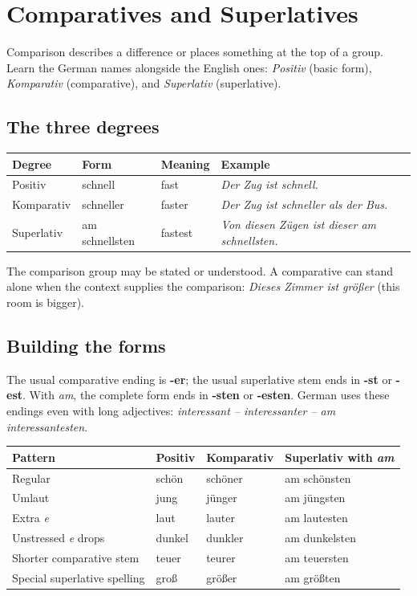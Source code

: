 \chapter{Comparatives and Superlatives}
\label{chap:comparison}

Comparison describes a difference or places something at the top of a group.
Learn the German names alongside the English ones: \textit{Positiv}
(basic form), \textit{Komparativ} (comparative), and \textit{Superlativ}
(superlative).

\section{The three degrees}

\begin{center}
\small
{}
\begin{tabularx}{\textwidth}{@{}lllX@{}}
\toprule
Degree & Form & Meaning & Example \\
\midrule
Positiv & schnell & fast & \textit{Der Zug ist schnell.} \\
Komparativ & schneller & faster & \textit{Der Zug ist schneller als der Bus.} \\
Superlativ & am schnellsten & fastest & \textit{Von diesen Zügen ist dieser am schnellsten.} \\
\bottomrule
\end{tabularx}
\end{center}

The comparison group may be stated or understood. A comparative can stand
alone when the context supplies the comparison: \textit{Dieses Zimmer ist
größer} (this room is bigger).

\section{Building the forms}

The usual comparative ending is \textbf{-er}; the usual superlative stem
ends in \textbf{-st} or \textbf{-est}. With \textit{am}, the complete form
ends in \textbf{-sten} or \textbf{-esten}. German uses these endings even
with long adjectives: \textit{interessant -- interessanter -- am interessantesten}.

\begin{center}
\small
{}
\begin{tabularx}{\textwidth}{@{}l l l X@{}}
\toprule
Pattern & Positiv & Komparativ & Superlativ with \textit{am} \\
\midrule
Regular & schön & schöner & am schönsten \\
Umlaut & jung & jünger & am jüngsten \\
Extra \textit{e} & laut & lauter & am lautesten \\
Unstressed \textit{e} drops & dunkel & dunkler & am dunkelsten \\
Shorter comparative stem & teuer & teurer & am teuersten \\
Special superlative spelling & groß & größer & am größten \\
\bottomrule
\end{tabularx}
\end{center}


